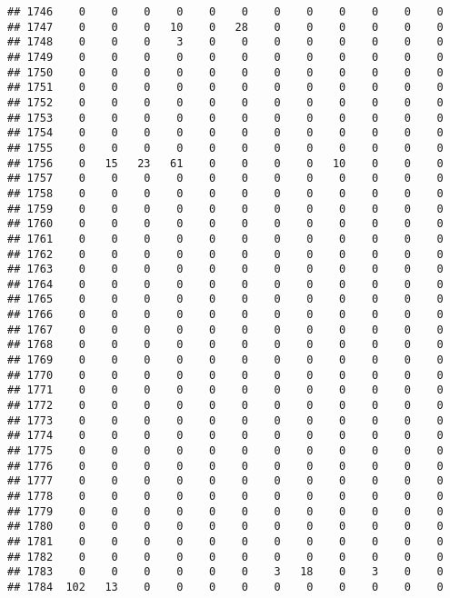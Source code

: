 \documentclass[]{article}
\begin{document}
\begin{verbatim}
## 1746    0    0    0    0    0    0    0    0    0    0    0    0
## 1747    0    0    0   10    0   28    0    0    0    0    0    0
## 1748    0    0    0    3    0    0    0    0    0    0    0    0
## 1749    0    0    0    0    0    0    0    0    0    0    0    0
## 1750    0    0    0    0    0    0    0    0    0    0    0    0
## 1751    0    0    0    0    0    0    0    0    0    0    0    0
## 1752    0    0    0    0    0    0    0    0    0    0    0    0
## 1753    0    0    0    0    0    0    0    0    0    0    0    0
## 1754    0    0    0    0    0    0    0    0    0    0    0    0
## 1755    0    0    0    0    0    0    0    0    0    0    0    0
## 1756    0   15   23   61    0    0    0    0   10    0    0    0
## 1757    0    0    0    0    0    0    0    0    0    0    0    0
## 1758    0    0    0    0    0    0    0    0    0    0    0    0
## 1759    0    0    0    0    0    0    0    0    0    0    0    0
## 1760    0    0    0    0    0    0    0    0    0    0    0    0
## 1761    0    0    0    0    0    0    0    0    0    0    0    0
## 1762    0    0    0    0    0    0    0    0    0    0    0    0
## 1763    0    0    0    0    0    0    0    0    0    0    0    0
## 1764    0    0    0    0    0    0    0    0    0    0    0    0
## 1765    0    0    0    0    0    0    0    0    0    0    0    0
## 1766    0    0    0    0    0    0    0    0    0    0    0    0
## 1767    0    0    0    0    0    0    0    0    0    0    0    0
## 1768    0    0    0    0    0    0    0    0    0    0    0    0
## 1769    0    0    0    0    0    0    0    0    0    0    0    0
## 1770    0    0    0    0    0    0    0    0    0    0    0    0
## 1771    0    0    0    0    0    0    0    0    0    0    0    0
## 1772    0    0    0    0    0    0    0    0    0    0    0    0
## 1773    0    0    0    0    0    0    0    0    0    0    0    0
## 1774    0    0    0    0    0    0    0    0    0    0    0    0
## 1775    0    0    0    0    0    0    0    0    0    0    0    0
## 1776    0    0    0    0    0    0    0    0    0    0    0    0
## 1777    0    0    0    0    0    0    0    0    0    0    0    0
## 1778    0    0    0    0    0    0    0    0    0    0    0    0
## 1779    0    0    0    0    0    0    0    0    0    0    0    0
## 1780    0    0    0    0    0    0    0    0    0    0    0    0
## 1781    0    0    0    0    0    0    0    0    0    0    0    0
## 1782    0    0    0    0    0    0    0    0    0    0    0    0
## 1783    0    0    0    0    0    0    3   18    0    3    0    0
## 1784  102   13    0    0    0    0    0    0    0    0    0    0

\end{verbatim}
\end{document}
